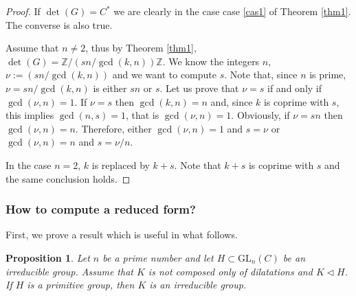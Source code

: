 \documentclass[a4paper,11pt]{amsart}
\newcommand{\GL}{\operatorname{GL}}
\newtheorem{prop}[thm]{Proposition}
\def\GL{\mathrm{GL}}
\def\Z{\mathbb{Z}}
\begin{document}
\begin{proof}
If $\det(G)=C^*$ we are clearly in the case case \ref{cas1} of Theorem \ref{thm1}.  The converse is also true.  
 \par 
 Assume that $n\neq 2$, thus by Theorem \ref{thm1},  $\det(G)=\Z/  (sn/\gcd(k,n)) \Z$.  We know the integers $n$, $\nu:=(sn/\gcd(k,n))$  and we want to compute $s$. 
Note that, since $n$ is prime,  $\nu=sn/\gcd(k,n)$ is either $sn$ or $s$.  Let us prove that $\nu=s$ if and only if  $\gcd(\nu,n)=1$.    If $\nu=s$ then $\gcd(k,n)=n$ and, since  $k$ is coprime with $s$,  this implies $\gcd(n,s)=1$, that is $\gcd(\nu,n)=1$. Obviously, if $\nu=sn$ then $\gcd(\nu,n)=n$.  
Therefore, either $\gcd(\nu,n)=1$ and $s=\nu$ or $\gcd(\nu,n)=n$ and $s=\nu/n$. \par 
In the case $n=2$, $k$ is replaced by $k+s$.  Note that $k+s$ is coprime with $s$ and the same conclusion holds.  
\end{proof}

\subsubsection{How to compute a reduced form?}

First, we prove a result which is useful in what follows.

\begin{prop}
\label{prop:irred_primitive}
    Let $n$ be a prime number and let $H\subset\GL_n(C)$ be an irreducible group. Assume that $K$ is not composed only of dilatations and $K\triangleleft H$. If $H$ is a primitive group, then $K$ is an irreducible group.
\end{prop}
\end{document}
